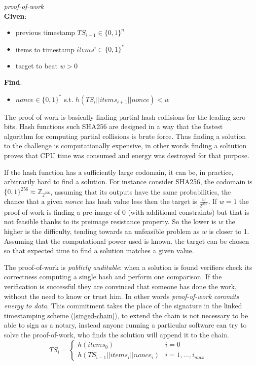 \begin{mydef}{\textit{proof-of-work}}
\label{pow}
\\
\textbf{Given}:
\begin{itemize}
	\item previous timestamp $TS_{i-1} \in \{0,1\}^n$
	\item items to timestamp $items^i \in \{0,1\}^*$
	\item target to beat $w>0$
\end{itemize}
\textbf{Find}:
\begin{itemize}
	\item $nonce \in \{0,1\}^*$ s.t. $h(TS_i || items_{i+1} || nonce) < w$
\end{itemize}
\end{mydef}

The proof of work is basically finding partial hash collisions for the leading zero bits. Hash functions such SHA256 are designed in a way that the fastest algorithm for computing partial collisions is brute force. Thus finding a solution to the challenge is computationally expensive, in other words finding a soltution proves that CPU time was consumed and energy was destroyed for that purpose.
 
If the hash function has a sufficiently large codomain, it can be, in practice, arbitrarily hard to find a solution. For instance consider SHA256, the codomain is $\{0,1\}^{256} \approx \mathbb{Z}_{2^{256}}$, assuming that its outputs have the same probabilities, the chance that a given $nonce$ has hash value less then the target is $\frac{w}{2^{256}}$.  
If $w=1$ the proof-of-work is finding a pre-image of 0 (with additional constraints) but that is not feasible thanks to its preimage resistance property. 
So the lower is $w$ the higher is the difficulty, tending towards an unfeasible problem as $w$ is closer to 1. 
Assuming that the computational power used is known, the target can be chosen so that expected time to find a solution matches a given value.

The proof-of-work is \textit{publicly auditable}: when a solution is found verifiers check its correctness computing a single hash and perform one comparison. If the verification is successful they are convinced that someone has done the work, without the need to know or trust him. In other words \textit{proof-of-work commits energy to data}.
This commitment takes the place of the signature in the linked timestamping scheme (\ref{singed-chain}), to extend the chain is not necessary to be able to sign as a notary, instead anyone running a particular software can try to solve the proof-of-work, who finds the solution will append it to the chain. 
\begin{equation}
\label{chain-nonce}
TS_i =   
\begin{cases} 
h(items_0) & i=0\\ 
 h(TS_{i-1}||items_i||nonce_i) & i=1, ..., i_{max} 
\end{cases}
\end{equation}


